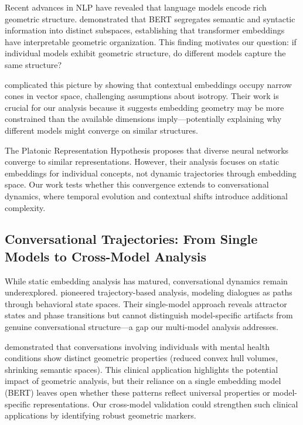 \documentclass[11pt,letterpaper]{article}
\begin{document}
Recent advances in NLP have revealed that language models encode rich geometric structure. \citet{reif2019visualizing} demonstrated that BERT segregates semantic and syntactic information into distinct subspaces, establishing that transformer embeddings have interpretable geometric organization. This finding motivates our question: if individual models exhibit geometric structure, do different models capture the same structure?

\citet{ethayarajh2019contextual} complicated this picture by showing that contextual embeddings occupy narrow cones in vector space, challenging assumptions about isotropy. Their work is crucial for our analysis because it suggests embedding geometry may be more constrained than the available dimensions imply—potentially explaining why different models might converge on similar structures.

The Platonic Representation Hypothesis \citep{huh2024platonic} proposes that diverse neural networks converge to similar representations. However, their analysis focuses on static embeddings for individual concepts, not dynamic trajectories through embedding space. Our work tests whether this convergence extends to conversational dynamics, where temporal evolution and contextual shifts introduce additional complexity.

\subsection{Conversational Trajectories: From Single Models to Cross-Model Analysis}

While static embedding analysis has matured, conversational dynamics remain underexplored. \citet{brinberg2024dynamic} pioneered trajectory-based analysis, modeling dialogues as paths through behavioral state spaces. Their single-model approach reveals attractor states and phase transitions but cannot distinguish model-specific artifacts from genuine conversational structure—a gap our multi-model analysis addresses.

\citet{palominos2024trajectories} demonstrated that conversations involving individuals with mental health conditions show distinct geometric properties (reduced convex hull volumes, shrinking semantic spaces). This clinical application highlights the potential impact of geometric analysis, but their reliance on a single embedding model (BERT) leaves open whether these patterns reflect universal properties or model-specific representations. Our cross-model validation could strengthen such clinical applications by identifying robust geometric markers.
\end{document}
